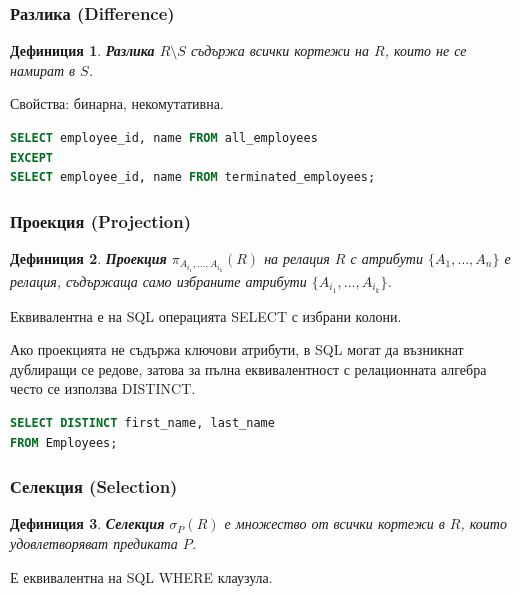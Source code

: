 \documentclass{scrartcl}
\newtheorem{definition}{Дефиниция}
\begin{document}
\begin{FlushLeft}
\subsubsection{Разлика (Difference)}

\begin{definition}
\textbf{\textit{Разлика}} $R \setminus S$ съдържа всички кортежи на $R$, които не се намират в $S$.
\end{definition}

Свойства: бинарна, некомутативна.

\begin{lstlisting}[language=SQL, caption=EXCEPT or MINUS]
SELECT employee_id, name FROM all_employees
EXCEPT
SELECT employee_id, name FROM terminated_employees;
\end{lstlisting}

\subsubsection{Проекция (Projection)}

\begin{definition}
\textbf{\textit{Проекция}} $\pi_{A_{i_1}, \ldots, A_{i_k}}(R)$ на релация $R$ с атрибути $\{A_1, \ldots, A_n\}$ е релация, съдържаща само избраните атрибути $\{A_{i_1}, \ldots, A_{i_k}\}$.
\end{definition}

Еквивалентна е на SQL операцията SELECT с избрани колони.

Ако проекцията не съдържа ключови атрибути, в SQL могат да възникнат дублиращи се редове, затова за пълна еквивалентност с релационната алгебра често се използва DISTINCT.

\begin{lstlisting}[language=SQL, caption=Projection (SELECT)]
SELECT DISTINCT first_name, last_name
FROM Employees;
\end{lstlisting}

\subsubsection{Селекция (Selection)}

\begin{definition}
\textbf{\textit{Селекция}} $\sigma_P(R)$ е множество от всички кортежи в $R$, които удовлетворяват предиката $P$.
\end{definition}

Е еквивалентна на SQL WHERE клаузула.


\end{FlushLeft}
\end{document}
